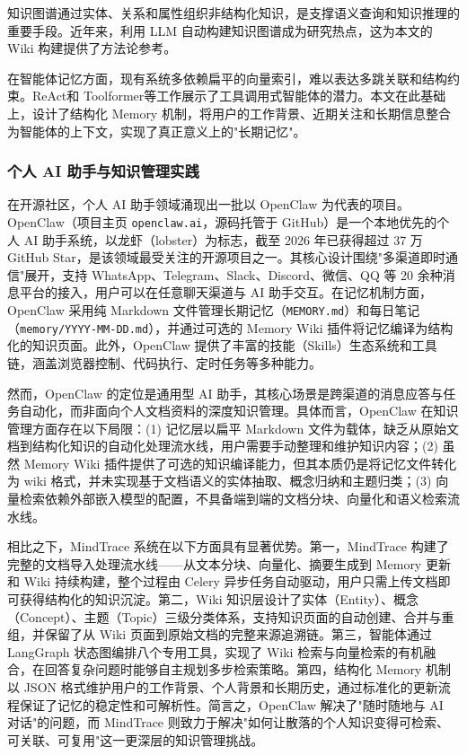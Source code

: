 知识图谱通过实体、关系和属性组织非结构化知识，是支撑语义查询和知识推理的重要手段\cite{liu2016kgconstruction}。近年来，利用 LLM 自动构建知识图谱成为研究热点\cite{zhang2022kgconstruction,xu2016kgsurvey}，这为本文的 Wiki 构建提供了方法论参考。

在智能体记忆方面，现有系统多依赖扁平的向量索引，难以表达多跳关联和结构约束。ReAct\cite{yao2023react}和 Toolformer\cite{schick2023toolformer}等工作展示了工具调用式智能体的潜力。本文在此基础上，设计了结构化 Memory 机制，将用户的工作背景、近期关注和长期信息整合为智能体的上下文，实现了真正意义上的"长期记忆"。

\subsubsection{个人 AI 助手与知识管理实践}

在开源社区，个人 AI 助手领域涌现出一批以 OpenClaw 为代表的项目。OpenClaw（项目主页 \texttt{openclaw.ai}，源码托管于 GitHub）是一个本地优先的个人 AI 助手系统，以龙虾（lobster）为标志，截至 2026 年已获得超过 37 万 GitHub Star，是该领域最受关注的开源项目之一。其核心设计围绕"多渠道即时通信"展开，支持 WhatsApp、Telegram、Slack、Discord、微信、QQ 等 20 余种消息平台的接入，用户可以在任意聊天渠道与 AI 助手交互。在记忆机制方面，OpenClaw 采用纯 Markdown 文件管理长期记忆（\texttt{MEMORY.md}）和每日笔记（\texttt{memory/YYYY-MM-DD.md}），并通过可选的 Memory Wiki 插件将记忆编译为结构化的知识页面。此外，OpenClaw 提供了丰富的技能（Skills）生态系统和工具链，涵盖浏览器控制、代码执行、定时任务等多种能力。

然而，OpenClaw 的定位是通用型 AI 助手，其核心场景是跨渠道的消息应答与任务自动化，而非面向个人文档资料的深度知识管理。具体而言，OpenClaw 在知识管理方面存在以下局限：(1) 记忆层以扁平 Markdown 文件为载体，缺乏从原始文档到结构化知识的自动化处理流水线，用户需要手动整理和维护知识内容；(2) 虽然 Memory Wiki 插件提供了可选的知识编译能力，但其本质仍是将记忆文件转化为 wiki 格式，并未实现基于文档语义的实体抽取、概念归纳和主题归类；(3) 向量检索依赖外部嵌入模型的配置，不具备端到端的文档分块、向量化和语义检索流水线。

相比之下，MindTrace 系统在以下方面具有显著优势。第一，MindTrace 构建了完整的文档导入处理流水线——从文本分块、向量化、摘要生成到 Memory 更新和 Wiki 持续构建，整个过程由 Celery 异步任务自动驱动，用户只需上传文档即可获得结构化的知识沉淀。第二，Wiki 知识层设计了实体（Entity）、概念（Concept）、主题（Topic）三级分类体系，支持知识页面的自动创建、合并与重组，并保留了从 Wiki 页面到原始文档的完整来源追溯链。第三，智能体通过 LangGraph 状态图编排八个专用工具，实现了 Wiki 检索与向量检索的有机融合，在回答复杂问题时能够自主规划多步检索策略。第四，结构化 Memory 机制以 JSON 格式维护用户的工作背景、个人背景和长期历史，通过标准化的更新流程保证了记忆的稳定性和可解析性。简言之，OpenClaw 解决了"随时随地与 AI 对话"的问题，而 MindTrace 则致力于解决"如何让散落的个人知识变得可检索、可关联、可复用"这一更深层的知识管理挑战。

